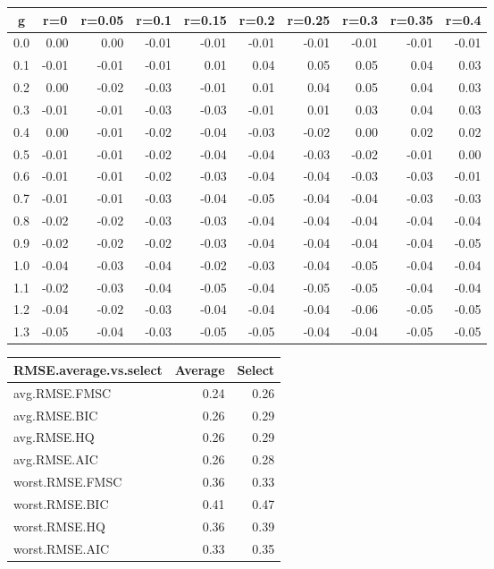 %
\begin{table}[!tbp]
 \begin{center}
 \begin{tabular}{rrrrrrrrrr}\hline\hline
\multicolumn{1}{c}{g}&\multicolumn{1}{c}{r=0}&\multicolumn{1}{c}{r=0.05}&\multicolumn{1}{c}{r=0.1}&\multicolumn{1}{c}{r=0.15}&\multicolumn{1}{c}{r=0.2}&\multicolumn{1}{c}{r=0.25}&\multicolumn{1}{c}{r=0.3}&\multicolumn{1}{c}{r=0.35}&\multicolumn{1}{c}{r=0.4}\tabularnewline
\hline
0.0& 0.00& 0.00&-0.01&-0.01&-0.01&-0.01&-0.01&-0.01&-0.01\tabularnewline
0.1&-0.01&-0.01&-0.01& 0.01& 0.04& 0.05& 0.05& 0.04& 0.03\tabularnewline
0.2& 0.00&-0.02&-0.03&-0.01& 0.01& 0.04& 0.05& 0.04& 0.03\tabularnewline
0.3&-0.01&-0.01&-0.03&-0.03&-0.01& 0.01& 0.03& 0.04& 0.03\tabularnewline
0.4& 0.00&-0.01&-0.02&-0.04&-0.03&-0.02& 0.00& 0.02& 0.02\tabularnewline
0.5&-0.01&-0.01&-0.02&-0.04&-0.04&-0.03&-0.02&-0.01& 0.00\tabularnewline
0.6&-0.01&-0.01&-0.02&-0.03&-0.04&-0.04&-0.03&-0.03&-0.01\tabularnewline
0.7&-0.01&-0.01&-0.03&-0.04&-0.05&-0.04&-0.04&-0.03&-0.03\tabularnewline
0.8&-0.02&-0.02&-0.03&-0.03&-0.04&-0.04&-0.04&-0.04&-0.04\tabularnewline
0.9&-0.02&-0.02&-0.02&-0.03&-0.04&-0.04&-0.04&-0.04&-0.05\tabularnewline
1.0&-0.04&-0.03&-0.04&-0.02&-0.03&-0.04&-0.05&-0.04&-0.04\tabularnewline
1.1&-0.02&-0.03&-0.04&-0.05&-0.04&-0.05&-0.05&-0.04&-0.04\tabularnewline
1.2&-0.04&-0.02&-0.03&-0.04&-0.04&-0.04&-0.06&-0.05&-0.05\tabularnewline
1.3&-0.05&-0.04&-0.03&-0.05&-0.05&-0.04&-0.04&-0.05&-0.05\tabularnewline
\hline
\end{tabular}

\end{center}

\end{table}

%
\begin{table}[!tbp]
 \begin{center}
 \begin{tabular}{lrr}\hline\hline
\multicolumn{1}{l}{RMSE.average.vs.select}&\multicolumn{1}{c}{Average}&\multicolumn{1}{c}{Select}\tabularnewline
\hline
avg.RMSE.FMSC&0.24&0.26\tabularnewline
avg.RMSE.BIC&0.26&0.29\tabularnewline
avg.RMSE.HQ&0.26&0.29\tabularnewline
avg.RMSE.AIC&0.26&0.28\tabularnewline
worst.RMSE.FMSC&0.36&0.33\tabularnewline
worst.RMSE.BIC&0.41&0.47\tabularnewline
worst.RMSE.HQ&0.36&0.39\tabularnewline
worst.RMSE.AIC&0.33&0.35\tabularnewline
\hline
\end{tabular}

\end{center}

\end{table}

